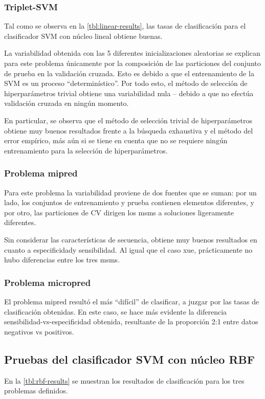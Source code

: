 \documentclass[12pt,bibliography=oldstyle,DIV=12,parskip=half-]{scrreprt}
\begin{document}
%
\subsubsection{Triplet-SVM}
%
Tal como se observa en la \autoref{tbl:linear-results}, las tasas de
clasificación para el clasificador SVM con núcleo lineal obtiene
buenas.

La variabilidad obtenida con las 5 diferentes inicializaciones
aleatorias se explican para este problema únicamente por la
composición de las particiones del conjunto de prueba en la validación
cruzada.  Esto es debido a que el entrenamiento de la SVM es un
proceso ``determinístico''.  Por todo esto, el método de selección de
hiperparámetros trivial obtiene una variabilidad nula -- debido a que
no efectúa validación cruzada en ningún momento.

En particular, se observa que el método de selección trivial de
hiperparámetros obtiene muy buenos resultados frente a la búsqueda
exhaustiva y el método del error empírico, más aún si se tiene en
cuenta que no se requiere ningún entrenamiento para la selección de
hiperparámetros.
%
\subsubsection{Problema mipred}
%
Para este problema la variabilidad proviene de dos fuentes que se
suman: por un lado, los conjuntos de entrenamiento y prueba contienen
elementos diferentes, y por otro, las particiones de CV dirigen los
msms a soluciones ligeramente diferentes.

Sin considerar las características de secuencia, obtiene muy buenos
resultados en cuanto a especificidady sensibilidad. Al igual que el
caso xue, prácticamente no hubo diferencias entre los tres msms.
%
\subsubsection{Problema micropred}
%
El problema mipred resultó el más ``difícil'' de clasificar, a juzgar
por las tasas de clasificación obtenidas. En este caso, se hace más
evidente la diferencia sensibilidad-vs-especificidad obtenida,
resultante de la proporción 2:1 entre datos negativos vs positivos.
%
%
%
\subsection{Pruebas del clasificador SVM con núcleo RBF}
%
En la \autoref{tbl:rbf-results} se muestran los resultados de
clasificación para los tres problemas definidos.
\end{document}
